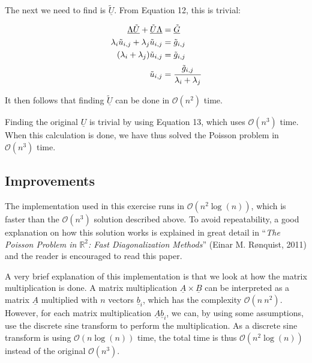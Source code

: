 The next we need to find is $\underline{\tilde{U}}$. From Equation 12, this is
trivial:

\begin{align*}
  \underline {\Lambda \tilde{U}} + \underline {\tilde{U} \Lambda} &=
  \underline{\tilde{G}}\\
  \lambda_i\tilde{u}_{i,j} + \lambda_j\tilde{u}_{i,j} &= \tilde{g}_{i,j} \\
  (\lambda_i + \lambda_j)\tilde{u}_{i,j} &= \tilde{g}_{i,j} \\
  \tilde{u}_{i,j} &= \cfrac{\tilde{g}_{i,j}}{\lambda_i + \lambda_j}
\end{align*}

It then follows that finding $\underline{\tilde{U}}$ can be done in
$\mathcal{O}(n^2)$ time.

Finding the original $\underline U$ is trivial by using Equation 13, which uses
$\mathcal{O}(n^3)$ time. When this calculation is done, we have thus solved the
Poisson problem in $\mathcal{O}(n^3)$ time.

\subsection{Improvements}

The implementation used in this exercise runs in $\mathcal{O}(n^2\log (n))$,
which is faster than the $\mathcal{O}(n^3)$ solution described above. To avoid
repeatability, a good explanation on how this solution works is explained in
great detail in ``{\em The Poisson Problem in $\mathbb{R}^2$: Fast
  Diagonalization Methods}'' (Einar M. Rønquist, 2011) and the reader is
encouraged to read this paper.

A very brief explanation of this implementation is that we look at how the
matrix multiplication is done. A matrix multiplication $\underline A \times
\underline B$ can be interpreted as a matrix $\underline A$ multiplied with $n$
vectors $\underline b_i$, which has the complexity $\mathcal{O}(n~n^2)$.
However, for each matrix multiplication $\underline A \underline b_i$, we can,
by using some assumptions, use the discrete sine transform to perform the
multiplication. As a discrete sine transform is using $\mathcal{O}(n \log (n))$
time, the total time is thus $\mathcal{O}(n^2\log (n))$ instead of the original
$\mathcal{O}(n^3)$.

